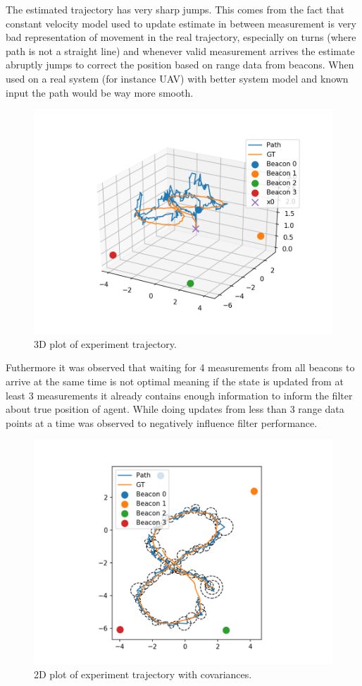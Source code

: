 The estimated trajectory has very sharp jumps. This comes from the fact that constant velocity model used to update estimate in between measurement is very bad representation of movement in the real trajectory, especially on turns (where path is not a straight line) and whenever valid measurement arrives the estimate abruptly jumps to correct the position based on range data from beacons. When used on a real system (for instance UAV) with better system model and known input the path would be way more smooth.
\begin{figure}[H]
    \centering
    \includegraphics[width=\linewidth]{figures/3d_path.png}
    \caption{3D plot of experiment trajectory.}
    \label{fig:exp_3D_path}
\end{figure}

Futhermore it was observed that waiting for 4 measurements from all beacons to arrive at the same time is not optimal meaning if the state is updated from at least 3 measurements it already contains enough information to inform the filter about true position of agent. While doing updates from less than 3 range data points at a time was observed to negatively influence filter performance.



\begin{figure}[H]
    \centering
    \includegraphics[width=\linewidth]{figures/2d_with_cov.png}
    \caption{2D plot of experiment trajectory with covariances.}
    \label{fig:exp_2d_path_covariances}
\end{figure}

